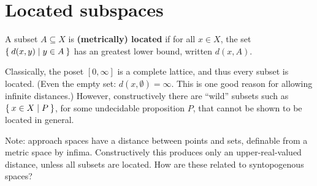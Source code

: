 \documentclass{article}
\def\Rp{[0,\infty]}
\begin{document}




\section{Located subspaces}
\label{sec:located}

\begin{defn}
  A subset $A\subseteq X$ is \textbf{(metrically) located} if for all $x\in X$, the set $\Set{ d(x,y) | y\in A }$ has an greatest lower bound, written $d(x,A)$.
\end{defn}

Classically, the poset $\Rp$ is a complete lattice, and thus every subset is located.
(Even the empty set: $d(x,\emptyset)=\infty$.
This is one good reason for allowing infinite distances.)
However, constructively there are ``wild'' subsets such as $\Set{x\in X | P}$, for some undecidable proposition $P$, that cannot be shown to be located in general.

Note: approach spaces have a distance between points and sets, definable from a metric space by infima.
Constructively this produces only an upper-real-valued distance, unless all subsets are located.
How are these related to syntopogenous spaces?




\end{document}
